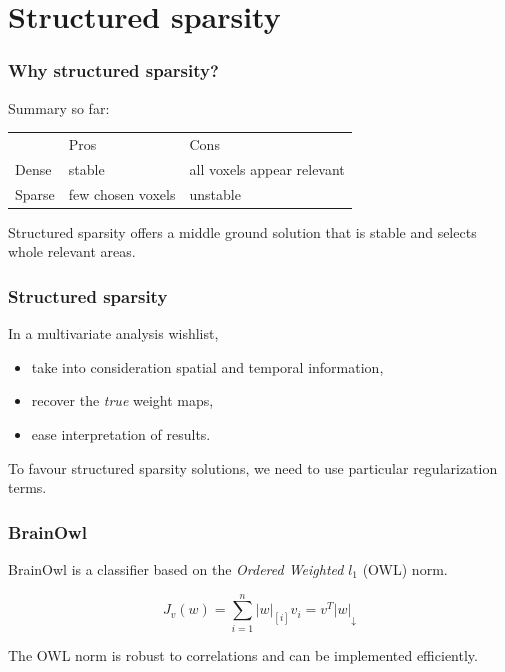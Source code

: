 \documentclass[11pt]{beamer}
\begin{document}
\section{Structured sparsity}
\label{sec:Structured sparsity}

\begin{frame}
    \frametitle{Why structured sparsity?}

    Summary so far:

    \begin{center}
        \begin{tabular}[h]{@{}lll@{}}
            & Pros & Cons \\
            \cmidrule(r){2-3}
            Dense & stable & all voxels appear relevant \\
            Sparse & few chosen voxels & unstable
        \end{tabular}
    \end{center} 
    
    \pause

    Structured sparsity offers a middle ground solution that is stable and
    selects whole relevant areas.

\end{frame}

\begin{frame}
    \frametitle{Structured sparsity}
    In a multivariate analysis wishlist,
    \begin{itemize}
        \item take into consideration spatial and temporal information, \pause
        \item recover the \emph{true} weight maps, \pause
        \item ease interpretation of results. \pause
    \end{itemize}

    To favour structured sparsity solutions, we need to use particular
    regularization terms.

\end{frame}

\begin{frame}
    \frametitle{BrainOwl}
    BrainOwl is a classifier based on the \emph{Ordered Weighted} $l_1$
    (OWL) norm.

    \[J_v(w) = \sum_{i=1}^{n} |w|_{[i]} v_i = v^T |w|_{\downarrow}\]

    The OWL norm is robust to correlations and can be implemented efficiently.

\end{frame}
\end{document}
